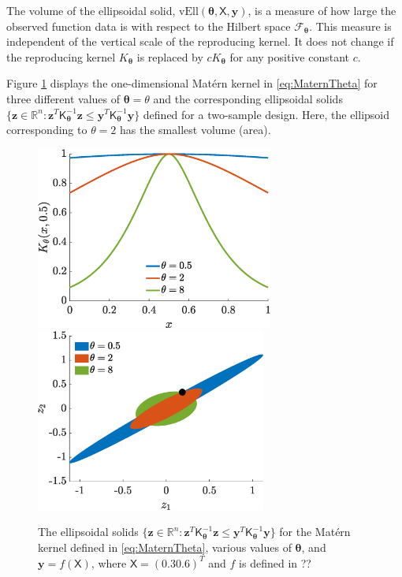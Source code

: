 \documentclass[]{mcom-l}
\theoremstyle{remark}
\newcommand{\vEll}{\text{vEll}}
\newcommand{\reals}{{\mathbb{R}}}
\newcommand{\mK}{\mathsf{K}}
\newcommand{\mX}{\mathsf{X}}
\newcommand{\by}{{\boldsymbol{y}}}
\newcommand{\bz}{{\boldsymbol{z}}}
\newcommand{\btheta}{{\boldsymbol{\theta}}}
\newcommand{\calf}{{\mathcal{F}}}
\begin{document}
The volume of the ellipsoidal solid, $\vEll(\btheta,\mX,\by)$, is a measure of how large the observed function data is with respect to the Hilbert space $\calf_{\btheta}$.  This measure is independent of the vertical scale of the reproducing kernel.  It does not change if the reproducing kernel $K_\btheta$ is replaced by $cK_{\btheta}$ for any positive constant $c$.  

Figure \ref{fig:ellipPlot} displays the one-dimensional Mat\'ern kernel in \eqref{eq:MaternTheta} for three different values of $\btheta = \theta$ and the corresponding  ellipsoidal solids $\{ \bz \in \reals^n : \bz^T \mK_\btheta^{-1} \bz \le \by^T \mK_\btheta^{-1} \by  \bigr \}$  defined for a two-sample design.  Here, the ellipsoid corresponding to $\theta = 2$ has the smallest volume (area).


\begin{figure}[H]
	\centering
	\includegraphics[height = 6cm]{ProgramsImages/KthetaPlot.eps} \qquad
	\includegraphics[height = 6cm]{ProgramsImages/ellipsesPlot.eps}
	\caption{The ellipsoidal solids $\{ \bz \in \reals^n : \bz^T \mK_\btheta^{-1} \bz \le \by^T \mK_\btheta^{-1} \by  \bigr \}$ for the Mat\'ern kernel defined in \eqref{eq:MaternTheta}, various values of $\btheta$, and $\by = f(\mX)$, where $\mX = (0.3 0.6)^T$ and $f$ is defined in ?? \label{fig:ellipPlot}}
\end{figure}
\end{document}
